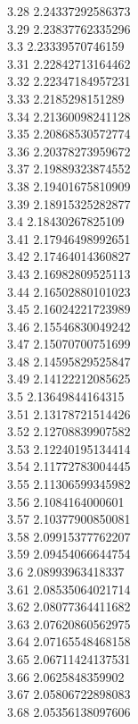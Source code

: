 {3.28	2.24337292586373\\
3.29	2.23837762335296\\
3.3	2.23339570746159\\
3.31	2.22842713164462\\
3.32	2.22347184957231\\
3.33	2.2185298151289\\
3.34	2.21360098241128\\
3.35	2.20868530572774\\
3.36	2.20378273959672\\
3.37	2.19889323874552\\
3.38	2.19401675810909\\
3.39	2.18915325282877\\
3.4	2.18430267825109\\
3.41	2.17946498992651\\
3.42	2.17464014360827\\
3.43	2.16982809525113\\
3.44	2.16502880101023\\
3.45	2.16024221723989\\
3.46	2.15546830049242\\
3.47	2.15070700751699\\
3.48	2.14595829525847\\
3.49	2.14122212085625\\
3.5	2.13649844164315\\
3.51	2.13178721514426\\
3.52	2.12708839907582\\
3.53	2.12240195134414\\
3.54	2.11772783004445\\
3.55	2.11306599345982\\
3.56	2.1084164000601\\
3.57	2.10377900850081\\
3.58	2.09915377762207\\
3.59	2.09454066644754\\
3.6	2.08993963418337\\
3.61	2.08535064021714\\
3.62	2.08077364411682\\
3.63	2.07620860562975\\
3.64	2.07165548468158\\
3.65	2.06711424137531\\
3.66	2.0625848359902\\
3.67	2.05806722898083\\
3.68	2.05356138097606\\
}
